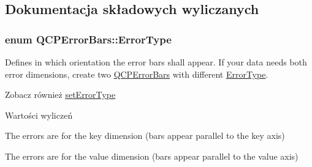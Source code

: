 \subsection{Dokumentacja składowych wyliczanych}
\subsubsection[{\texorpdfstring{Error\+Type}{ErrorType}}]{\setlength{\rightskip}{0pt plus 5cm}enum {\bf Q\+C\+P\+Error\+Bars\+::\+Error\+Type}}\hypertarget{class_q_c_p_error_bars_a95f0220f11a72648b96480a85ce26474}{}\label{class_q_c_p_error_bars_a95f0220f11a72648b96480a85ce26474}
Defines in which orientation the error bars shall appear. If your data needs both error dimensions, create two \hyperlink{class_q_c_p_error_bars}{Q\+C\+P\+Error\+Bars} with different \hyperlink{class_q_c_p_error_bars_a95f0220f11a72648b96480a85ce26474}{Error\+Type}.

\begin{DoxySeeAlso}{Zobacz również}
\hyperlink{class_q_c_p_error_bars_af0af493d454a8f3a0908830160680d2b}{set\+Error\+Type} 
\end{DoxySeeAlso}
\begin{Desc}
\item[Wartości wyliczeń]\par
\begin{description}
\item[{\em 
et\+Key\+Error\hypertarget{class_q_c_p_error_bars_a95f0220f11a72648b96480a85ce26474a9fca24d20d5376e41be216fc9b08cd21}{}\label{class_q_c_p_error_bars_a95f0220f11a72648b96480a85ce26474a9fca24d20d5376e41be216fc9b08cd21}
}]The errors are for the key dimension (bars appear parallel to the key axis) \item[{\em 
et\+Value\+Error\hypertarget{class_q_c_p_error_bars_a95f0220f11a72648b96480a85ce26474a5f760fc9c0a98c7f1e93e33bf54e9d83}{}\label{class_q_c_p_error_bars_a95f0220f11a72648b96480a85ce26474a5f760fc9c0a98c7f1e93e33bf54e9d83}
}]The errors are for the value dimension (bars appear parallel to the value axis) \end{description}
\end{Desc}


